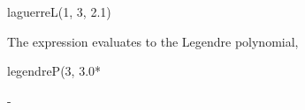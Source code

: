 {{{{{{{{{{{\begin{xtc}
\begin{spadsrc}
\end{spadsrc}
\begin{TeXOutput}
\begin{fricasmath}{16}
%
\end{fricasmath}
\end{TeXOutput}
\end{xtc}
\begin{xtc}
\begin{xtccomment}
\end{xtccomment}
\begin{spadsrc}
laguerreL(1, 3, 2.1)
\end{spadsrc}
\begin{TeXOutput}
\begin{fricasmath}{17}
%
\end{fricasmath}
\end{TeXOutput}
\end{xtc}
\begin{xtc}
\begin{xtccomment}
The expression
 evaluates to the  Legendre polynomial,
\end{xtccomment}
\begin{spadsrc}
\end{spadsrc}
\begin{TeXOutput}
\begin{fricasmath}{18}
%
\end{fricasmath}
\end{TeXOutput}
\end{xtc}
\begin{xtc}
\begin{xtccomment}
\end{xtccomment}
\begin{spadsrc}
legendreP(3, 3.0*%
\end{spadsrc}
\begin{TeXOutput}
\begin{fricasmath}{19}
-{\TIMES \ImaginaryI }%
\end{fricasmath}
\end{TeXOutput}
\end{xtc}
%

}}}}}}}}}}}
